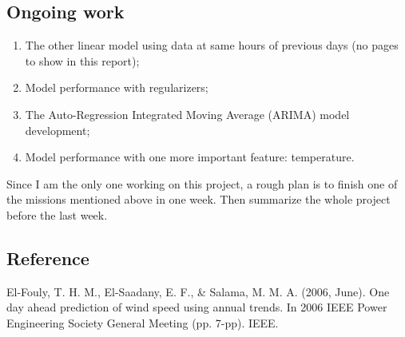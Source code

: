 \documentclass{article}
\begin{document}
\subsection*{Ongoing work}
\begin{enumerate}
 \item The other linear model using data at same hours of previous days (no pages to show in this report);
 \item Model performance with regularizers;
 \item The Auto-Regression Integrated Moving Average (ARIMA) model development;
 \item Model performance with one more important feature: temperature.
\end{enumerate}
Since I am the only one working on this project, a rough plan is to finish one of the missions mentioned above in one week.  Then summarize the whole project before the last week.\\

\subsection*{Reference}
El-Fouly, T. H. M., El-Saadany, E. F., \& Salama, M. M. A. (2006, June). One day ahead prediction of wind speed using annual trends. In 2006 IEEE Power Engineering Society General Meeting (pp. 7-pp). IEEE.
\end{document}
